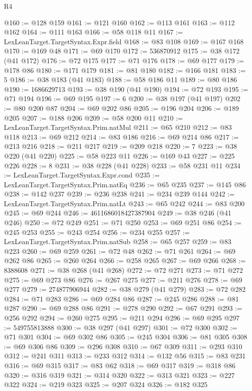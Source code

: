 \begin{lexlean}{R4}
\begin{coremodule}
@160 := @128 @159
@161 := @121 @160
@162 := @113 @161
@163 := @112 @162
@164 := @111 @163
@166 := @58 @118 @11
@167 := LexLeanTarget.TargetSyntax.Expr.field
@168 := @83 @108
@169 := @167 @168
@170 := @169 @48
@171 := @69 @170
@172 := 536870912
@175 := @38 @172 (@41 @172)
@176 := @72 @175
@177 := @71 @176
@178 := @69 @177
@179 := @178 @86
@180 := @171 @179
@181 := @81 @180
@182 := @166 @181
@183 := 5
@186 := @38 @183 (@41 @183)
@188 := @58 @186 @11
@189 := @80 @186
@190 := 1686629713
@193 := @38 @190 (@41 @190)
@194 := @72 @193
@195 := @71 @194
@196 := @69 @195
@197 := 6
@200 := @38 @197 (@41 @197)
@202 := @80 @200 @87
@204 := @69 @202 @86
@205 := @196 @204
@206 := @189 @205
@207 := @188 @206
@209 := @58 @200 @11
@210 := LexLeanTarget.TargetSyntax.Prim.natMul
@211 := @65 @210
@212 := @83 @118
@213 := @69 @212
@214 := @83 @186
@216 := @69 @214 @86
@217 := @213 @216
@218 := @211 @217
@219 := @209 @218
@220 := 7
@223 := @38 @220 (@41 @220)
@225 := @58 @223 @11
@226 := @169 @43
@227 := @225 @226
@228 := 8
@231 := @38 @228 (@41 @228)
@233 := @58 @231 @11
@234 := LexLeanTarget.TargetSyntax.Expr.cond
@235 := LexLeanTarget.TargetSyntax.Prim.natEq
@236 := @65 @235
@237 := @145 @86
@238 := @142 @237
@239 := @236 @238
@241 := @234 @239 @144
@242 := LexLeanTarget.TargetSyntax.Prim.natLt
@243 := @65 @242
@244 := @83 @200
@245 := @69 @244
@246 := 4611686018427387904
@249 := @38 @246 (@41 @246)
@250 := @72 @249
@251 := @71 @250
@253 := @69 @251 @86
@254 := @245 @253
@255 := @243 @254
@256 := @234 @255
@257 := LexLeanTarget.TargetSyntax.Prim.natSub
@258 := @65 @257
@259 := @83 @223
@260 := @69 @259
@261 := @72 @48
@262 := @71 @261
@264 := @69 @262 @86
@265 := @260 @264
@266 := @258 @265
@267 := @69 @266
@268 := 8388608
@271 := @38 @268 (@41 @268)
@272 := @72 @271
@273 := @71 @272
@275 := @69 @273 @86
@276 := @267 @275
@277 := @211 @276
@278 := @69 @277
@279 := 274877906944
@282 := @38 @279 (@41 @279)
@283 := @72 @282
@284 := @71 @283
@286 := @69 @284 @86
@287 := @245 @286
@288 := @81 @287
@290 := @69 @288 @86
@291 := @278 @290
@292 := @67 @291
@293 := @256 @292
@294 := @260 @275
@295 := @211 @294
@296 := @69 @295
@297 := 549755813888
@300 := @38 @297 (@41 @297)
@301 := @72 @300
@302 := @71 @301
@304 := @69 @302 @86
@305 := @245 @304
@306 := @81 @305
@308 := @69 @306 @86
@309 := @296 @308
@310 := @67 @309
@311 := @293 @310
@312 := @241 @311
@313 := @233 @312
@314 := @132 @56
@315 := @83 @231
@316 := @69 @315
@317 := @83 @62
@318 := @69 @317
@319 := @318 @86
@320 := @316 @319
@321 := @314 @320
@322 := @313 @321
@323 := @227 @322
@324 := @219 @323
@325 := @207 @324
@326 := @182 @325

\end{coremodule}
\end{lexlean}
